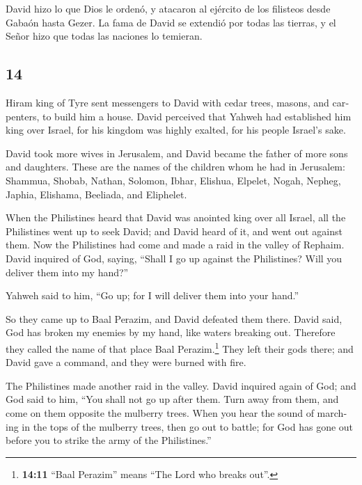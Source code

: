 \begin{paracol}{2}
 David hizo lo que Dios le ordenó, y atacaron al ejército
de los filisteos desde Gabaón hasta Gezer.  La fama de
David se extendió por todas las tierras, y el Señor hizo que todas las
naciones lo temieran.

\switchcolumn
\begin{otherlanguage}{english}

\hypertarget{section-27}{%
\section{14}\label{section-27}}

 Hiram king of Tyre sent messengers to David with cedar
trees, masons, and carpenters, to build him a house. 
David perceived that Yahweh had established him king over Israel, for
his kingdom was highly exalted, for his people Israel's sake.

 David took more wives in Jerusalem, and David became the
father of more sons and daughters.  These are the names of
the children whom he had in Jerusalem: Shammua, Shobab, Nathan, Solomon,
 Ibhar, Elishua, Elpelet,  Nogah, Nepheg,
Japhia,  Elishama, Beeliada, and Eliphelet.

 When the Philistines heard that David was anointed king
over all Israel, all the Philistines went up to seek David; and David
heard of it, and went out against them.  Now the
Philistines had come and made a raid in the valley of Rephaim.
 David inquired of God, saying, ``Shall I go up against
the Philistines? Will you deliver them into my hand?''

Yahweh said to him, ``Go up; for I will deliver them into your hand.''

 So they came up to Baal Perazim, and David defeated them
there. David said, God has broken my enemies by my hand, like waters
breaking out. Therefore they called the name of that place Baal
Perazim.\footnote{\textbf{14:11} ``Baal Perazim'' means ``The Lord who
  breaks out''.}  They left their gods there; and David
gave a command, and they were burned with fire.

 The Philistines made another raid in the valley.
 David inquired again of God; and God said to him, ``You
shall not go up after them. Turn away from them, and come on them
opposite the mulberry trees.  When you hear the sound of
marching in the tops of the mulberry trees, then go out to battle; for
God has gone out before you to strike the army of the Philistines.''


\end{otherlanguage}
\end{paracol}
